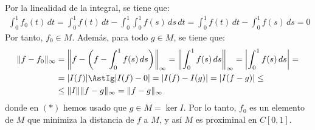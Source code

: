 \begin{ejercicio}
\begin{description}
    Por la linealidad de la integral, se tiene que:
    \begin{align*}
        \int_{0}^1 f_0(t)\,dt = \int_{0}^1 f(t)\,dt - \int_{0}^1 \int_{0}^1 f(s)\,ds\,dt = \int_{0}^1 f(t)\,dt - \int_{0}^1 f(s)\,ds = 0
    \end{align*}
    Por tanto, $f_0 \in M$. Además, para todo $g \in M$, se tiene que:
    \begin{align*}
        \|f - f_0\|_\infty &= \left\|f - \left(f - \int_{0}^1 f(s)\,ds\right)\right\|_\infty = \left\|\int_{0}^1 f(s)\,ds\right\|_\infty = \left|\int_{0}^1 f(s)\,ds\right| =\\&= |I(f)| \AstIg |I(f)-0| = |I(f)-I(g)| = |I(f-g)| \leq\\&\leq  \|I\| \|f-g\|_\infty = \|f-g\|_\infty
    \end{align*}
    donde en $(\ast)$ hemos usado que $g \in M = \ker I$. Por lo tanto, $f_0$ es un elemento de $M$ que minimiza la distancia de $f$ a $M$, y así $M$ es proximinal en $C[0, 1]$.
\end{description}
\end{ejercicio}